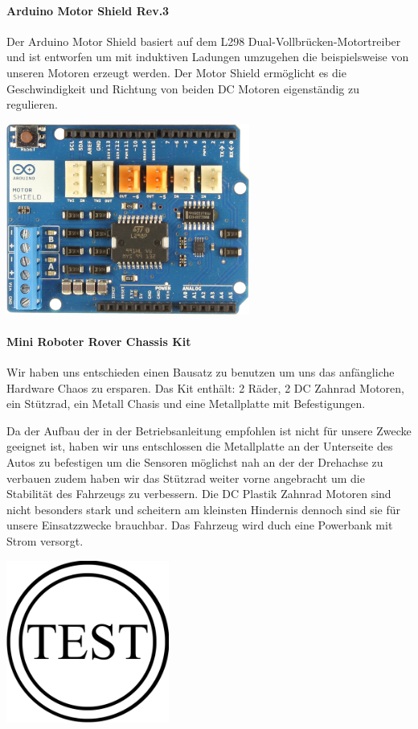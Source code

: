 \documentclass[12pt]{article}
\begin{document}
\paragraph{Arduino Motor Shield Rev.3} Der Arduino Motor Shield basiert auf dem L298 Dual-Vollbrücken-Motortreiber und ist entworfen um mit induktiven Ladungen umzugehen die beispielsweise von unseren Motoren erzeugt werden. Der Motor Shield ermöglicht es die Geschwindigkeit und Richtung von beiden DC Motoren eigenständig zu regulieren.

\vspace{0.5cm}
\includegraphics[width=0.6\textwidth]{images/MotorShield_Front.jpg}\par
\cite{motorShield-front}

\paragraph{Mini Roboter Rover Chassis Kit} Wir haben uns entschieden einen Bausatz zu benutzen um uns das anfängliche Hardware Chaos zu ersparen. Das Kit enthält: 2 Räder, 2 DC Zahnrad Motoren, ein Stützrad, ein Metall Chasis und eine Metallplatte mit Befestigungen.

Da der Aufbau der in der Betriebsanleitung empfohlen ist nicht für unsere Zwecke geeignet ist, haben wir uns entschlossen die Metallplatte an der Unterseite des Autos zu befestigen um die Sensoren möglichst nah an der der Drehachse zu verbauen zudem haben wir das Stützrad weiter vorne angebracht um die Stabilität des Fahrzeugs zu verbessern. Die DC Plastik Zahnrad Motoren sind nicht besonders stark und scheitern am kleinsten Hindernis dennoch sind sie für unsere Einsatzzwecke brauchbar. Das Fahrzeug wird duch eine Powerbank mit Strom versorgt.
\vspace{0.5cm}

\includegraphics[width=0.4\textwidth]{images/example.png}
\newpage
\end{document}
